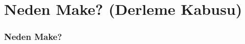 \documentclass{beamer}
\begin{document}
\section{Neden Make? (Derleme Kabusu)}
{
\begin{frame}
    \frametitle{Neden Make?}
    
\end{frame}
}
\end{document}
